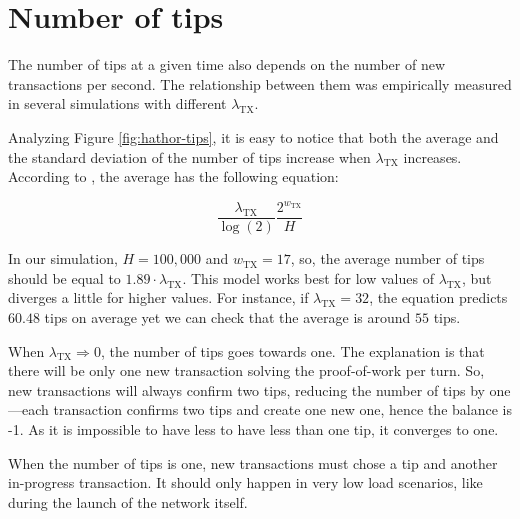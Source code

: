 \section{Number of tips}

The number of tips at a given time also depends on the number of new transactions per second. The relationship between them was empirically measured in several simulations with different $\lambda_\text{TX}$.

Analyzing Figure \ref{fig:hathor-tips}, it is easy to notice that both the average and the standard deviation of the number of tips increase when $\lambda_\text{TX}$ increases. According to \citet{tangle2016}, the average has the following equation:

$$\frac{\lambda_\text{TX}}{\log(2)} \frac{2^{w_\text{TX}}}{H}$$

In our simulation, $H = 100,000$ and $w_\text{TX} = 17$, so, the average number of tips should be equal to $1.89 \cdot \lambda_\text{TX}$. This model works best for low values of $\lambda_\text{TX}$, but diverges a little for higher values. For instance, if $\lambda_\text{TX} = 32$, the equation predicts $60.48$ tips on average yet we can check that the average is around $55$ tips.

When $\lambda_\text{TX} \Rightarrow 0$, the number of tips goes towards one. The explanation is that there will be only one new transaction solving the proof-of-work per turn. So, new transactions will always confirm two tips, reducing the number of tips by one---each transaction confirms two tips and create one new one, hence the balance is -1. As it is impossible to have less to have less than one tip, it converges to one.

When the number of tips is one, new transactions must chose a tip and another in-progress transaction. It should only happen in very low load scenarios, like during the launch of the network itself.

